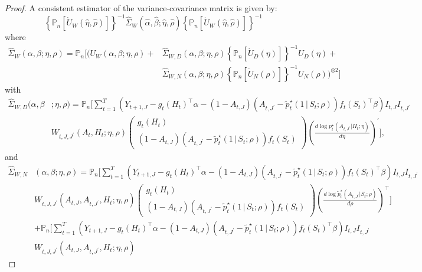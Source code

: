 \documentclass[supplementary, lineno]{biometrika}
\def\P{\mathbb{P}}
\def\given{\, | \,}
\begin{document}
\begin{proof}
A consistent estimator of the variance-covariance matrix is given by:
\begin{equation}
    \left\{ \P_n \left[\dot U_W(\hat\eta, \hat\rho) \right]\right\}^{-1} \hat\Sigma_W(\hat\alpha,\hat\beta;\hat\eta, \hat\rho) \left\{ \P_n \left[\dot U_W(\hat\eta, \hat\rho) \right]\right\}^{-1}
\end{equation}
where
\begin{align*}
    \hat\Sigma_W(\alpha,\beta;\eta, \rho) = \P_n \Big[\Big(U_W(\alpha,\beta;\eta, \rho) + &\hat\Sigma_{W,D}(\alpha,\beta;\eta, \rho) \left\{\P_n[\dot U_D(\eta)] \right\}^{-1} U_D(\eta) + \nonumber \\ &\hat\Sigma_{W,N}(\alpha,\beta;\eta, \rho)\left\{\P_n[\dot U_N(\rho)] \right\}^{-1} U_N(\rho) \Big)^ {\otimes 2} \Big]
\end{align*}
with
\begin{align*}
    \hat\Sigma_{W,D}(\alpha,\beta &; \eta, \rho)
    = \P_n \Big[ \sum_{t=1}^T \left( Y_{t+1,J} - g_t(H_t)^\top \alpha -  (1-A_{t,J})(A_{t,J^\prime} - \tilde p_t^\star (1 \given S_t;\rho) ) f_t (S_t)^\top \beta \right)I_{t,J}I_{t,J^\prime} \nonumber \\ &W_{t,J, J^\prime}(A_t,H_t; \eta,\rho)
    \begin{pmatrix}
  g_t(H_t) \\
  (1-A_{t,J})(A_{t,J^\prime} - \tilde {p}^\star_t (1 \given S_t;\rho) ) f_t (S_t)
\end{pmatrix}\left(\frac{d \log p^\star_t(A_{t,J^\prime}|H_t;\eta)}{d \eta} \right)^\prime \Big],
\end{align*}
and
\begin{align*}
    \hat\Sigma_{W,N}&(\alpha,\beta;\eta, \rho)
    = \P_n \Big[ \sum_{t=1}^T \left( Y_{t+1,J} - g_t(H_t)^\top \alpha -  (1-A_{t,J})(A_{t,J^\prime} - \tilde p_t^\star (1 \given S_t;\rho) ) f_t (S_t)^\top \beta \right)I_{t,J}I_{t,J^\prime} \nonumber \\ &W_{t,J, J^\prime}(A_{t,J},A_{t,J^\prime},H_t; \eta,\rho)
    \begin{pmatrix}
  g_t(H_t) \\
  (1-A_{t,J})(A_{t,J^\prime} - \tilde {p}^\star_t (1 \given S_t;\rho) ) f_t (S_t)
\end{pmatrix}\left(\frac{d \log \tilde p^\star_t(A_{t,J^\prime}|S_t;\rho)}{d \rho} \right)^\top \Big] \nonumber \\
&+\P_n \Big[ \sum_{t=1}^T \left( Y_{t+1,J} - g_t(H_t)^\top \alpha -  (1-A_{t,J})(A_{t,J^\prime} - \tilde p_t^\star (1 \given S_t;\rho) ) f_t (S_t)^\top \beta \right)I_{t,J}I_{t,J^\prime} \nonumber \\ &W_{t,J, J^\prime}(A_{t,J},A_{t,J^\prime},H_t; \eta,\rho)

\end{align*}
\end{proof}
\end{document}
